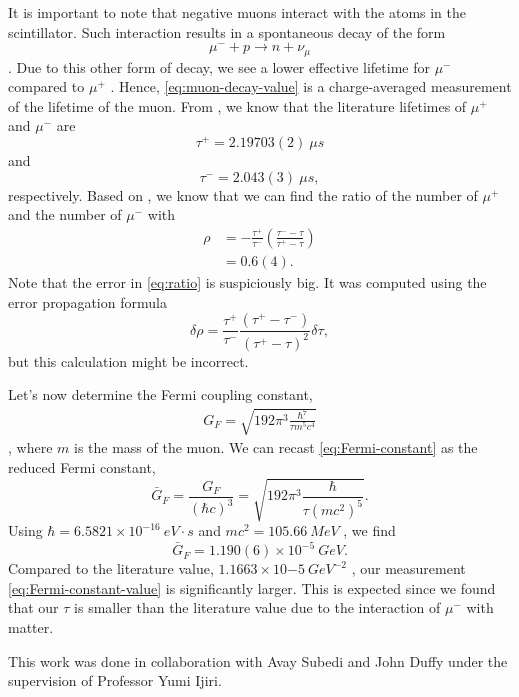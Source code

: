 \documentclass{../paper}
\begin{document}
It is important to note that negative muons interact with the atoms in the scintillator. Such interaction results in a spontaneous decay of the form
\begin{equation}
  \mu^- + p \to n + \nu_\mu
\end{equation}
\cite{TeachSpinManual}. Due to this other form of decay, we see a lower effective lifetime for $\mu^-$ compared to $\mu^+$ \cite{NIST_muon}. Hence, \eqref{eq:muon-decay-value} is a charge-averaged measurement of the lifetime of the muon. From \cite{TeachSpinManual}, we know that the literature lifetimes of $\mu^+$ and $\mu^-$ are
\begin{equation}
  \tau^+ = 2.19703(2) \ \mu s
\end{equation}
and
\begin{equation}
  \tau^- = 2.043(3) \ \mu s,
\end{equation}
respectively. Based on \cite{TeachSpinManual}, we know that we can find the ratio of the number of $\mu^+$ and the number of $\mu^-$ with
\begin{align}\label{eq:ratio}
  \rho
  &= -\frac{\tau^+}{\tau^-} \left(\frac{\tau^- - \tau}{\tau^+ - \tau}\right) \\
  &= 0.6(4).
\end{align}
Note that the error in \eqref{eq:ratio} is suspiciously big. It was computed using the error propagation formula
\begin{equation}\label{eq:rho-error}
  \delta\rho = \frac{\tau^+}{\tau^-} \frac{(\tau^+ - \tau^-)}{(\tau^+ - \tau)^2} \delta\tau,
\end{equation}
but this calculation might be incorrect.

Let's now determine the Fermi coupling constant,
\begin{align}\label{eq:Fermi-constant}
  G_F = \sqrt{192 \pi^3 \frac{\hbar^7}{\tau m^5 c^4}}
\end{align}
\cite{TeachSpinManual}, where $m$ is the mass of the muon. We can recast \eqref{eq:Fermi-constant} as the reduced Fermi constant,
\begin{equation}
  \bar G_F = \frac{G_F}{(\hbar c)^3} = \sqrt{ 192 \pi^3 \frac{\hbar}{\tau (m c^2)^5} }.
\end{equation}
Using $\hbar = 6.5821 \times 10^{-16} \ eV \cdot s$ \cite{NIST_hbar} and $m c^2 = 105.66 \ MeV$ \cite{NIST_muon}, we find
\begin{equation}\label{eq:Fermi-constant-value}
  \bar G_F = 1.190(6) \times 10^{-5} \ GeV.
\end{equation}
Compared to the literature value, $1.1663 \times 10{-5} \ GeV^{-2}$ \cite{NIST_Fermi}, our measurement \eqref{eq:Fermi-constant-value} is significantly larger. This is expected since we found that our $\tau$ is smaller than the literature value due to the interaction of $\mu^-$ with matter.

\begin{acknowledgements}
  This work was done in collaboration with Avay Subedi and John Duffy under the supervision of Professor Yumi Ijiri.
\end{acknowledgements}


\end{document}
